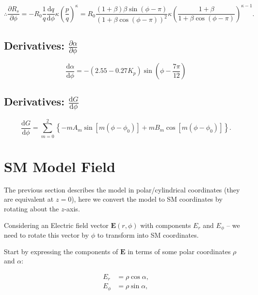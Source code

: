 \documentclass[]{article}
\begin{document}
		\begin{equation}
			\boxed{\therefore \frac{\partial R_s}{\partial \phi} = -R_0\frac{1}{q}\frac{\mathrm{d} q}{\mathrm{d} \phi} \kappa \left( \frac{p}{q} \right)^{\kappa}  = R_0 \frac{(1 + \beta)\beta \sin{(\phi - \pi)}}{(1 + \beta\cos{(\phi - \pi)})^2} \kappa \left(\frac{1+\beta}{1 + \beta\cos{(\phi-\pi)}}\right)^{\kappa-1}.}
		\end{equation}
			
		
		
	\subsection{Derivatives: $\frac{\partial \alpha}{\partial \phi}$}
	
		\begin{equation}
			\boxed{\frac{\mathrm{d} \alpha}{\mathrm{d} \phi} = -(2.55 - 0.27 K_p)\sin{\left(\phi - \frac{7\pi}{12}\right)}}
		\end{equation}
	
	\subsection{Derivatives: $\frac{\mathrm{d} G}{\mathrm{d} \phi}$}
	
		\begin{equation}
			\boxed{\frac{\mathrm{d} G}{\mathrm{d} \phi} = \sum_{m=0}^{2} \left\{-m A_m \sin{[m(\phi - \phi_0)]} + m B_m \cos{[m(\phi-\phi_0)]} \right\}.}
		\end{equation}
		
	
\section{SM Model Field}

	The previous section describes the model in polar/cylindrical coordinates (they are equivalent at $z=0$), here we convert the model to SM coordinates by rotating about the $z$-axis.
	
	Considering an Electric field vector $\mathbf{E}(r,\phi)$ with components $E_r$ and $E_\phi$ -- we need to rotate this vector by $\phi$ to transform into SM coordinates.
	
	Start by expressing the components of $\mathbf{E}$ in terms of some polar coordinates $\rho$ and $\alpha$:
	
	\begin{align}
		E_r &= \rho \cos{\alpha}, \label{EqEr}\\
		E_\phi &= \rho \sin{\alpha}, \label{EqEp}
	\end{align}
	
\end{document}

